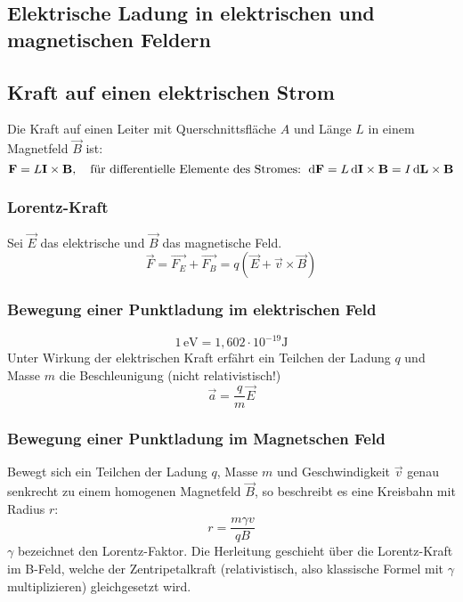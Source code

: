 \subsection{Elektrische Ladung in elektrischen und magnetischen Feldern}
\subsection{Kraft auf einen elektrischen Strom}
Die Kraft auf einen Leiter mit Querschnittsfläche $A$ und Länge $L$ in einem Magnetfeld $\vec{B}$ ist:
\begin{equation}
\mathbf{F} = L\mathbf{I} \times \mathbf{B}, \quad\text{für differentielle Elemente des Stromes: } \,\mathrm{d}\mathbf{F} = L \,\mathrm{d}\mathbf{I} \times \mathbf{B} = I \,\mathrm{d}\mathbf{L} \times \mathbf{B}
\end{equation}
\subsubsection{Lorentz-Kraft}
Sei $\vec{E}$ das elektrische und $\vec{B}$ das magnetische Feld.
\begin{equation}
\vec{F} = \vec{F_E} + \vec{F_B} = q \left( \vec{E} + \vec{v} \times \vec{B} \right)
\end{equation}
\subsubsection{Bewegung einer Punktladung im elektrischen Feld}
\begin{equation}
1 \, \mathrm{eV} = 1,602 \cdot 10^{-19} \mathrm{J}
\end{equation}
Unter Wirkung der elektrischen Kraft erfährt ein Teilchen der Ladung $q$ und Masse $m$ die Beschleunigung (nicht relativistisch!)
\begin{equation}
\vec{a} = \frac{q}{m}\vec{E}
\end{equation}
\subsubsection{Bewegung einer Punktladung im Magnetschen Feld}
Bewegt sich ein Teilchen der Ladung $q$, Masse $m$ und Geschwindigkeit $\vec{v}$ genau senkrecht zu einem homogenen Magnetfeld $\vec{B}$, so beschreibt es eine Kreisbahn mit Radius $r$:
\begin{equation}
r = \frac{m \gamma v}{q B}
\end{equation}
$\gamma$ bezeichnet den Lorentz-Faktor. Die Herleitung geschieht über die Lorentz-Kraft im B-Feld, welche der Zentripetalkraft (relativistisch, also klassische Formel mit $\gamma$ multiplizieren) gleichgesetzt wird.
